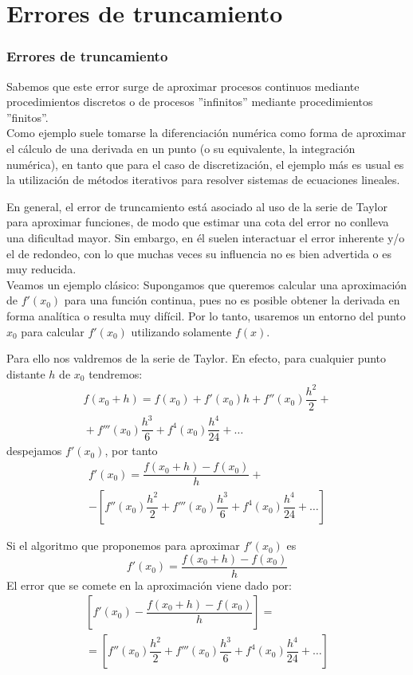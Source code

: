 \section{Errores de truncamiento}
\begin{frame}
\frametitle{Errores de truncamiento}
Sabemos que este error surge de aproximar procesos continuos mediante procedimientos discretos o
de procesos ''infinitos'' mediante procedimientos ''finitos''.
\\
\medskip
Como ejemplo suele tomarse la diferenciación numérica como forma de aproximar el cálculo de una derivada en un punto (o su equivalente, la integración numérica), en tanto que para el caso de discretización, el ejemplo más es usual es la utilización de métodos iterativos para resolver sistemas de ecuaciones lineales.
\end{frame}
\begin{frame}
En general, el error de truncamiento está asociado al uso de la serie de Taylor para aproximar funciones, de modo que estimar una cota del error no conlleva una dificultad mayor. Sin embargo, en él suelen interactuar el error inherente y/o el de redondeo, con lo que muchas veces su influencia no es bien advertida o es muy reducida. 
\\
\medskip
Veamos un ejemplo clásico: Supongamos que queremos calcular una aproximación de $f'(x_{0})$ para una función continua, pues no es posible obtener la derivada en forma analítica o resulta muy difícil. Por lo tanto, usaremos un entorno del punto $x_{0}$ para calcular $f'(x_{0})$ utilizando solamente $f(x)$.
\end{frame}
\begin{frame}
Para ello nos valdremos de la serie de Taylor. En efecto, para cualquier punto distante $h$ de $x_{0}$ tendremos:
\[ \begin{split}
f(x_{0} + h) = f(x_{0}) + f'(x_{0})h + f''(x_{0}) \dfrac{h^{2}}{2} + \\
{} + f'''(x_{0}) \dfrac{h^{3}}{6} + f^{4}(x_{0}) \dfrac{h^{4}}{24} + \ldots
\end{split} \]
\pause
despejamos $f'(x_{0})$, por tanto
\[ \begin{split} 
f'(x_{0}) = \dfrac{f(x_{0} + h) - f(x_{0})}{h} + \\
- \left[ f''(x_{0}) \dfrac{h^{2}}{2} + f'''(x_{0}) \dfrac{h^{3}}{6} + f^{4}(x_{0}) \dfrac{h^{4}}{24} + \ldots \right] 
\end{split} \]
\end{frame}
\begin{frame}
Si el algoritmo que proponemos para aproximar $f'(x_{0})$ es
\[ f'(x_{0}) = \dfrac{f(x_{0} + h) - f(x_{0})}{h} \]
El error que se comete en la aproximación viene dado por:
\[ \begin{split}
\left[ f'(x_{0}) - \dfrac{f(x_{0} + h) - f(x_{0})}{h} \right] = \\
=  \left[  f''(x_{0}) \dfrac{h^{2}}{2} + f'''(x_{0}) \dfrac{h^{3}}{6} + f^{4}(x_{0}) \dfrac{h^{4}}{24} + \ldots \right] 
\end{split} \]
\end{frame}
